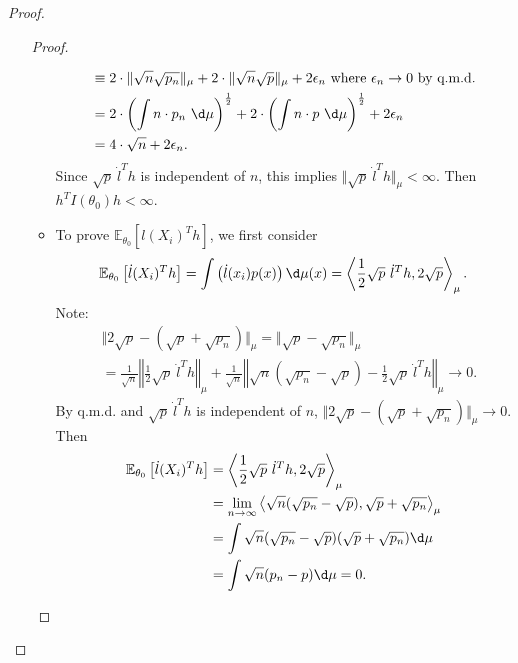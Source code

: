 \documentclass[a4paper]{article}
\begin{document}
\begin{proof}
\begin{itemize}[leftmargin=*]
\begin{proof}
\begin{itemize}
\begin{equation*}
\begin{aligned}
						&\equiv 2 \cdot \Vert \sqrt{n} \sqrt{p_n} \Vert_{\mu} + 2 \cdot \Vert \sqrt{n} \sqrt{p} \Vert_{\mu} + 2 \epsilon_n \text{ where $\epsilon_n \to 0$ by q.m.d.} \\
						&= 2 \cdot \left(\int n \cdot p_n \ \d \mu \right)^\frac{1}{2} + 2 \cdot \left(\int n \cdot p \ \d \mu \right)^\frac{1}{2} + 2 \epsilon_n \\
						&= 4 \cdot \sqrt{n} + 2 \epsilon_n.
					\end{aligned}
				\end{equation*}
				Since $\sqrt{p} \ \dot{l}^T h$ is independent of $n$, this implies $\Vert \sqrt{p} \ \dot{l}^T h\Vert_{\mu} < \infty$. Then $h^TI(\theta_0)h < \infty$.
				\item To prove $\mathbb{E}_{\theta_0} \left[l(X_i)^T h\right]$, we first consider
				\begin{equation*}
					\mathbb{E}_{\theta_0} \left[\dot{l} (X_i)^T h\right] = \int \left(\dot{l} (x_i) p(x) \right) \d \mu(x) = \left \langle \frac{1}{2} \sqrt{p} \ \dot{l}^T h, 2\sqrt{p} \right \rangle_{\mu}.
				\end{equation*}
				Note:
				\begin{equation*}
					\begin{aligned}
						&\Vert 2\sqrt{p} - \left(\sqrt{p} + \sqrt{p_n}\right)\Vert_{\mu} = \Vert \sqrt{p} - \sqrt{p_n} \Vert_{\mu} \\
						&= \frac{1}{\sqrt{n}} \left\Vert \frac{1}{2}\sqrt{p} \ \dot{l}^T h  \right\Vert_{\mu} +  \frac{1}{\sqrt{n}} \left \Vert \sqrt{n} \left(\sqrt{p_n} - \sqrt{p}\right) - \frac{1}{2}\sqrt{p} \ \dot{l}^T h \right \Vert_{\mu} \to 0.
					\end{aligned}
				\end{equation*}
				By q.m.d. and $\sqrt{p} \ \dot{l}^T h$ is independent of $n$, $\Vert 2\sqrt{p} - \left(\sqrt{p} + \sqrt{p_n}\right)\Vert_{\mu} \to 0$.
				Then
				\begin{equation*}
					\begin{aligned}
						\mathbb{E}_{\theta_0} \left[\dot{l} (X_i)^T h\right] &= \left \langle \frac{1}{2} \sqrt{p} \ \dot{l}^T h, 2\sqrt{p} \right \rangle_{\mu} \\
						&= \lim\limits_{n \to \infty} \left \langle \sqrt{n}(\sqrt{p_n}-\sqrt{p}), \sqrt{p} + \sqrt{p_n} \right \rangle_{\mu} \\
						&= \int \sqrt{n}(\sqrt{p_n}-\sqrt{p}) (\sqrt{p} + \sqrt{p_n}) \d \mu\\
						&= \int \sqrt{n}(p_n-p) \d \mu = 0.
					\end{aligned}

\end{equation*}
\end{itemize}
\end{proof}
\end{itemize}
\end{proof}
\end{document}
